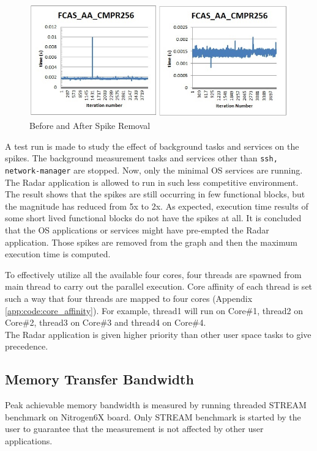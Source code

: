 \begin{figure}[h!]
	\centering
	\includegraphics[width=150mm]{figures/chop_off}
	\caption{Before and After Spike Removal}
	\label{fig:mm:chop_off}
\end{figure}
A test run is made to study the effect of background tasks and services on the spikes. The background measurement tasks and services other than \verb|ssh, network-manager| are stopped. Now, only the minimal OS services are running. The Radar application is allowed to run in such less competitive environment. The result shows that the spikes are still occurring in few functional blocks, but the magnitude has reduced from 5x to 2x. As expected, execution time results of some short lived functional blocks do not have the spikes at all. It is concluded that the OS applications or services might have pre-empted the Radar application. Those spikes are removed from the graph and then the maximum execution time is computed. \vspace*{0.2cm}

To effectively utilize all the available four cores, four threads are spawned from main thread to carry out the parallel execution. Core affinity of each thread is set such a way that four threads are mapped to four cores (Appendix \ref{app:code:core_affinity}). For example, thread1 will run on Core\#1, thread2 on Core\#2, thread3 on Core\#3 and thread4 on Core\#4.\\
The Radar application is given higher priority than other user space tasks to give precedence. 

\subsection{Memory Transfer Bandwidth}
\label{ss:mm:mem_bw}
Peak achievable memory bandwidth is measured by running threaded STREAM benchmark on Nitrogen6X board. Only STREAM benchmark is started by the user to guarantee that the measurement is not affected by other user applications. 


